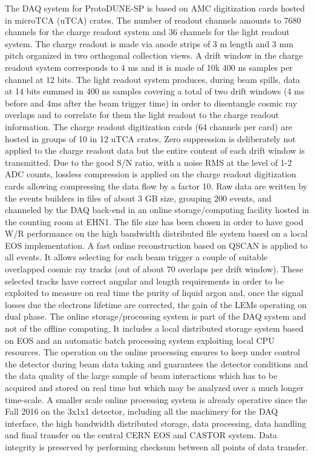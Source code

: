 \documentclass[12pt]{article}
\begin{document}
The DAQ system for ProtoDUNE-SP is based on AMC digitization cards hosted in microTCA (uTCA) crates. 
The number of readout channels amounts to 7680 channels for the charge readout system and 36 channels for the light readout system.
The charge readout is made via anode strips of 3 m length and 3 mm pitch organized in two orthogonal collection views. 
A drift window in the charge readout system corresponds to 4 ms and it is made of 10k 400 ns samples per channel at 12 bits. 
The light readout system produces, during beam spills, data at 14 bits summed in 400 ns samples covering a total of two drift windows
 (4 ms before and 4ms after the beam trigger time) in order to disentangle cosmic ray overlaps and to correlate for them the light readout to the charge readout information.
 The charge readout digitization cards (64 channels per card) are hosted in groups of 10 in 12 uTCA crates.
Zero suppression is deliberately not applied to the charge readout data but the entire content of each drift window is transmitted.
 Due to the good S/N ratio, with a noise RMS at the level of 1-2 ADC counts, lossless compression is applied on the charge readout digitization cards 
allowing compressing the data flow by a factor 10.
Raw data are written by the events builders in files of about 3 GB size, grouping 200 events, and channeled by the DAQ back-end in an 
online storage/computing facility hosted in the counting room at EHN1. The file size has been chosen in order to have good W/R
 performance on the high bandwidth distributed file system based on a local EOS implementation. A fast online reconstruction based on QSCAN
 is applied to all events. It allows selecting for each beam trigger a couple of suitable overlapped cosmic ray tracks (out of about 70 overlaps per drift window). 
These selected tracks have correct angular and length requirements in order to be exploited to measure on real time the purity of liquid argon and, 
once the signal losses due the electrons lifetime are corrected, the gain of the LEMs operating on dual phase. 
The online storage/processing system is part of the DAQ system and not of the offline computing.
 It includes a local distributed storage system based on EOS and an automatic batch processing system exploiting local CPU resources.
 The operation on the online processing ensures to keep under control the detector during beam 
data taking and guarantees the detector conditions and the data quality of the large sample of beam interactions which has
 to be acquired and stored on real time but which may be analyzed over a much longer time-scale.
A smaller scale online processing system is already operative since the Fall 2016 on the 3x1x1 detector,
 including all the machinery for the DAQ interface, the high bandwidth distributed storage, data processing, 
data handling and final transfer on the central CERN EOS and CASTOR system. Data integrity  is preserved by performing
checksum between all points of data transfer. 
\end{document}
